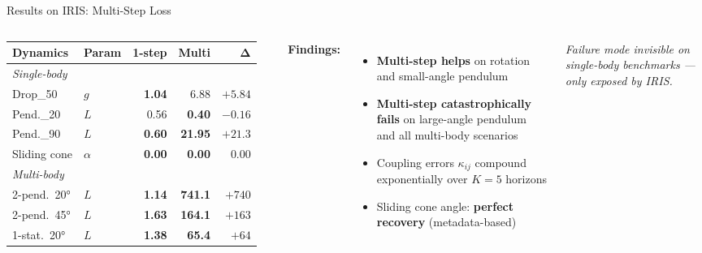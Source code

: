 \documentclass[aspectratio=169,12pt]{beamer}
\newcommand{\bad}[1]{\textcolor{irisred}{\textbf{#1}}}
\newcommand{\good}[1]{\textcolor{irisgreen}{\textbf{#1}}}
\begin{document}
\begin{frame}{Results on IRIS: Multi-Step Loss}
  \begin{columns}[T]
      \small
      \begin{tabular}{llrrr}
        \toprule
        \textbf{Dynamics} & \textbf{Param} & \textbf{1-step} & \textbf{Multi} & $\bm{\Delta}$ \\
        \midrule
        \multicolumn{5}{l}{\textit{Single-body}} \\
        Drop\_50      & $g$ & \good{1.04} & 6.88 & $+5.84$ \\
        Pend.\_20     & $L$ & 0.56 & \good{0.40} & $-0.16$ \\
        Pend.\_90     & $L$ & \good{0.60} & \bad{21.95} & $+21.3$ \\
        Sliding cone  & $\alpha$ & \good{0.00} & \good{0.00} & $0.00$ \\
        \midrule
        \multicolumn{5}{l}{\textit{Multi-body}} \\
        2-pend.\ 20° & $L$ & \good{1.14} & \bad{741.1} & $+740$ \\
        2-pend.\ 45° & $L$ & \good{1.63} & \bad{164.1} & $+163$ \\
        1-stat.\ 20° & $L$ & \good{1.38} & \bad{65.4}  & $+64$ \\
        \bottomrule
      \end{tabular}

      \textbf{Findings:}
      \begin{itemize}\setlength\itemsep{0.5em}
        \item \good{Multi-step helps} on rotation and small-angle pendulum
        \item \bad{Multi-step catastrophically fails} on large-angle pendulum and all multi-body scenarios
        \item Coupling errors $\kappa_{ij}$ compound exponentially over $K{=}5$ horizons
        \item Sliding cone angle: \good{perfect recovery} (metadata-based)
      \end{itemize}
      \vspace{0.4em}
      \textit{Failure mode invisible on single-body benchmarks — only exposed by IRIS.}
  \end{columns}
\end{frame}
\end{document}
